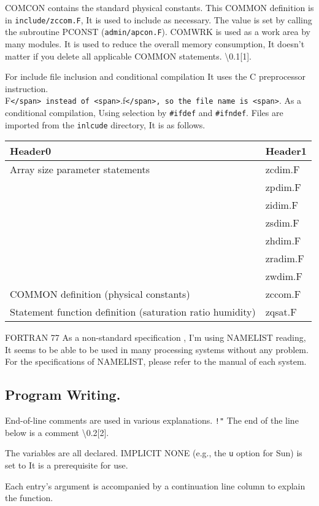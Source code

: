COMCON contains the standard physical constants. This COMMON definition
is in {\texttt{include/zccom.F}}, It is used to include as necessary.
The value is set by calling the subroutine PCONST
({\texttt{admin/apcon.F}}). COMWRK is used as a work area by many
modules. It is used to reduce the overall memory consumption, It doesn't
matter if you delete all applicable COMMON statements.
\textbackslash0.1{[}1{]}.

For include file inclusion and conditional compilation It uses the C
preprocessor instruction.
F\texttt{\textless{}/span\textgreater{}\ instead\ of\ \textless{}span\textgreater{}}.f\texttt{\textless{}/span\textgreater{},\ so\ the\ file\ name\ is\ \textless{}span\textgreater{}}.
As a conditional compilation, Using selection by {\texttt{\#ifdef}} and
{\texttt{\#ifndef}}. Files are imported from the {\texttt{inlcude}}
directory, It is as follows.

\begin{longtable}[]{@{}ll@{}}
\toprule
Header0 & Header1\tabularnewline
\midrule
\endhead
Array size parameter statements & zcdim.F\tabularnewline
& zpdim.F\tabularnewline
& zidim.F\tabularnewline
& zsdim.F\tabularnewline
& zhdim.F\tabularnewline
& zradim.F\tabularnewline
& zwdim.F\tabularnewline
COMMON definition (physical constants) & zccom.F\tabularnewline
Statement function definition (saturation ratio humidity) &
zqsat.F\tabularnewline
\bottomrule
\end{longtable}

FORTRAN 77 As a non-standard specification , I'm using NAMELIST reading,
It seems to be able to be used in many processing systems without any
problem. For the specifications of NAMELIST, please refer to the manual
of each system.

\hypertarget{program-writing.}{%
\subsection{Program Writing.}\label{program-writing.}}

End-of-line comments are used in various explanations. \texttt{!"} The
end of the line below is a comment \textbackslash0.2{[}2{]}.

The variables are all declared. IMPLICIT NONE (e.g., the {\texttt{u}}
option for Sun) is set to It is a prerequisite for use.

Each entry's argument is accompanied by a continuation line column to
explain the function.

